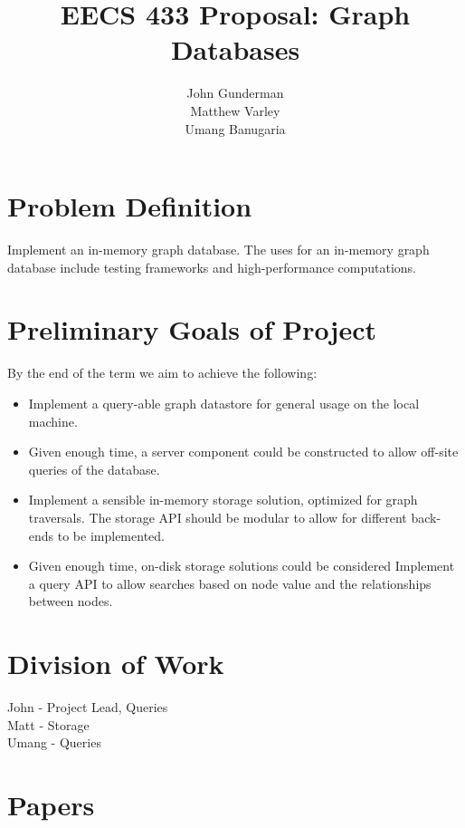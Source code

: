 \documentclass[11pt]{article}
\title{EECS 433 Proposal: Graph Databases}
\author{John Gunderman\\
		Matthew Varley\\
		Umang Banugaria}
\date{}
\begin{document}
\maketitle
\tableofcontents

\section{Problem Definition}
Implement an in-memory graph database. The uses for an in-memory graph database include testing frameworks and high-performance computations.

\section{Preliminary Goals of Project}
By the end of the term we aim to achieve the following:

\begin{itemize}
\item Implement a query-able graph datastore for general usage on the local machine.
\item Given enough time, a server component could be constructed to allow off-site queries of the database.
\item Implement a sensible in-memory storage solution, optimized for graph traversals. The storage API should be modular to allow for different back-ends to be implemented.
\item Given enough time, on-disk storage solutions could be considered
Implement a query API to allow searches based on node value and the relationships between nodes.
\end{itemize}

\section{Division of Work}

John - Project Lead, Queries \\
Matt - Storage \\
Umang -  Queries \\

\section{Papers}

\cite{Star} \cite{Cheng} \cite{Ma} \cite{Sun} \cite{Fan} \cite{He}



\end{document}
